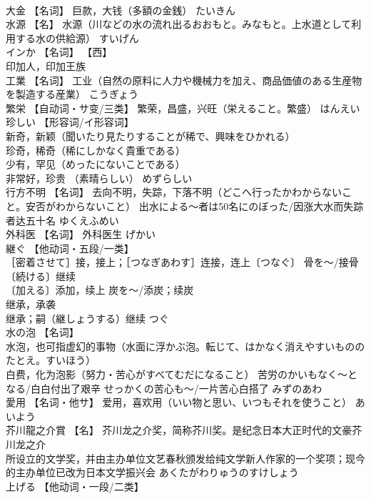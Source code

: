 \documentclass[8pt]{extreport}
\begin{document}
\begin{CJK}{UTF8}{min}
\\	大金	【名词】 巨款，大钱（多額の金銭）	たいきん	
\\	水源	【名】 水源（川などの水の流れ出るおおもと。みなもと。上水道として利用する水の供給源）	すいげん	
\\	インか	【名词】 【西】
\\	印加人，印加王族		
\\	工業	【名词】 工业（自然の原料に人力や機械力を加え、商品価値のある生産物を製造する産業）	こうぎょう	
\\	繁栄	【自动词・サ变/三类】 繁荣，昌盛，兴旺（栄えること。繁盛）	はんえい	
\\	珍しい	【形容词/イ形容词】 
\\	新奇，新颖（聞いたり見たりすることが稀で、興味をひかれる） 
\\	珍奇，稀奇（稀にしかなく貴重である） 
\\	少有，罕见（めったにないことである） 
\\	非常好，珍贵 （素晴らしい）	めずらしい	
\\	行方不明	【名词】 去向不明，失踪，下落不明（どこへ行ったかわからないこと。安否がわからないこと） 出水による～者は50名にのぼった/因涨大水而失踪者达五十名	ゆくえふめい	
\\	外科医	【名词】 外科医生	げかい	
\\	継ぐ	【他动词・五段/一类】 
\\	［密着させて］接，接上；［つなぎあわす］连接，连上〔つなぐ〕 骨を～/接骨 
\\	〔続ける〕继续 
\\	〔加える〕添加，续上 炭を～/添炭；续炭 
\\	继承，承袭 
\\	继承；嗣（継しょうする）继续	つぐ	
\\	水の泡	【名词】 
\\	水泡，也可指虚幻的事物（水面に浮かぶ泡。転じて、はかなく消えやすいもののたとえ。すいほう） 
\\	白费，化为泡影（努力・苦心がすべてむだになること） 苦労のかいもなく～となる/白白付出了艰辛 せっかくの苦心も～/一片苦心白搭了	みずのあわ	
\\	愛用	【名词・他サ】 爱用，喜欢用（いい物と思い、いつもそれを使うこと）	あいよう	
\\	芥川龍之介賞	【名】 芥川龙之介奖，简称芥川奖。是纪念日本大正时代的文豪芥川龙之介
\\	所设立的文学奖，并由主办单位文艺春秋颁发给纯文学新人作家的一个奖项；现今的主办单位已改为日本文学振兴会	あくたがわりゅうのすけしょう	
\\	上げる	【他动词・一段/二类】 

\end{CJK}
\end{document}
